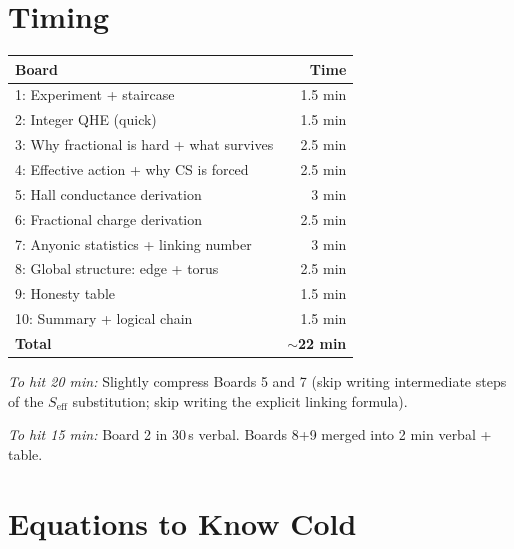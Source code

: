 \documentclass[11pt]{article}
\begin{document}
\newpage
\section*{Timing}

\begin{center}
\begin{tabular}{lr}
\toprule
Board & Time \\
\midrule
1: Experiment + staircase & 1.5 min \\
2: Integer QHE (quick) & 1.5 min \\
3: Why fractional is hard + what survives & 2.5 min \\
4: Effective action + why CS is forced & 2.5 min \\
5: Hall conductance derivation & 3 min \\
6: Fractional charge derivation & 2.5 min \\
7: Anyonic statistics + linking number & 3 min \\
8: Global structure: edge + torus & 2.5 min \\
9: Honesty table & 1.5 min \\
10: Summary + logical chain & 1.5 min \\
\midrule
\textbf{Total} & \textbf{$\sim$22 min} \\
\bottomrule
\end{tabular}
\end{center}

\noindent\textit{To hit 20 min:} Slightly compress Boards 5 and 7 (skip writing intermediate steps of the $S_{\mathrm{eff}}$ substitution; skip writing the explicit linking formula).

\noindent\textit{To hit 15 min:} Board 2 in 30\,s verbal. Boards 8+9 merged into 2 min verbal + table.

\newpage
\section*{Equations to Know Cold}
\end{document}
